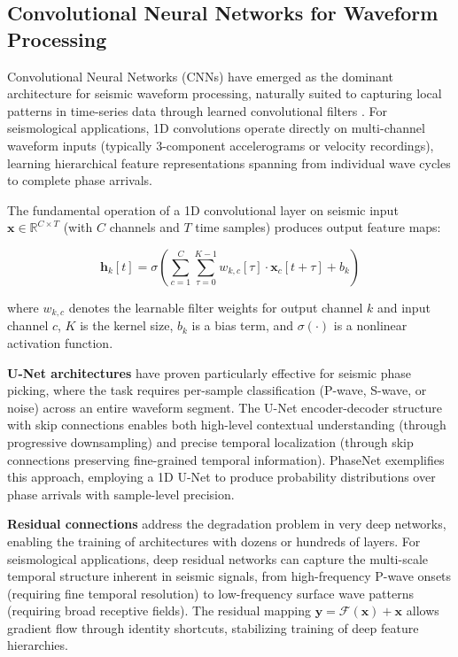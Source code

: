 \documentclass[review,authoryear]{elsarticle}
\begin{document}
\subsection{Convolutional Neural Networks for Waveform Processing}

Convolutional Neural Networks (CNNs) have emerged as the dominant architecture for seismic waveform processing, naturally suited to capturing local patterns in time-series data through learned convolutional filters \citep{lecun2015deep, lecun1998gradient}. For seismological applications, 1D convolutions operate directly on multi-channel waveform inputs (typically 3-component accelerograms or velocity recordings), learning hierarchical feature representations spanning from individual wave cycles to complete phase arrivals.

The fundamental operation of a 1D convolutional layer on seismic input $\mathbf{x} \in \mathbb{R}^{C \times T}$ (with $C$ channels and $T$ time samples) produces output feature maps:

\begin{equation}
\mathbf{h}_k[t] = \sigma\left(\sum_{c=1}^{C} \sum_{\tau=0}^{K-1} w_{k,c}[\tau] \cdot \mathbf{x}_c[t + \tau] + b_k\right)
\label{eq:conv1d}
\end{equation}

\noindent where $w_{k,c}$ denotes the learnable filter weights for output channel $k$ and input channel $c$, $K$ is the kernel size, $b_k$ is a bias term, and $\sigma(\cdot)$ is a nonlinear activation function.

\textbf{U-Net architectures} have proven particularly effective for seismic phase picking, where the task requires per-sample classification (P-wave, S-wave, or noise) across an entire waveform segment. The U-Net encoder-decoder structure with skip connections enables both high-level contextual understanding (through progressive downsampling) and precise temporal localization (through skip connections preserving fine-grained temporal information). PhaseNet \citep{zhu2019phasenet} exemplifies this approach, employing a 1D U-Net to produce probability distributions over phase arrivals with sample-level precision.

\textbf{Residual connections} \citep{he2016deep} address the degradation problem in very deep networks, enabling the training of architectures with dozens or hundreds of layers. For seismological applications, deep residual networks can capture the multi-scale temporal structure inherent in seismic signals, from high-frequency P-wave onsets (requiring fine temporal resolution) to low-frequency surface wave patterns (requiring broad receptive fields). The residual mapping $\mathbf{y} = \mathcal{F}(\mathbf{x}) + \mathbf{x}$ allows gradient flow through identity shortcuts, stabilizing training of deep feature hierarchies.
\end{document}
